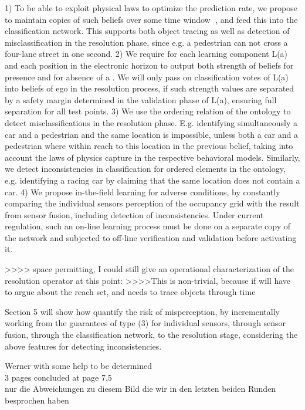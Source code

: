 1) To be able to exploit physical laws to optimize the prediction rate, we propose to maintain copies of such beliefs over some time window , and feed this into the classification network. This supports both object tracing as well as detection of misclassification in the resolution phase, since e.g. a pedestrian can not cross a four-lane street in one second.
2) We require for each learning component L(a) and each position in the electronic horizon to output both strength of beliefs for presence and for absence of a . We will only pass on classification votes of L(a) into beliefs of ego in the resolution process, if such strength values are separated by a safety margin determined in the validation phase of L(a), ensuring full separation for all test points.
3) We use the ordering relation of the ontology to detect misclassifications in the resolution phase. E.g. identifying simultaneously a car and a pedestrian and the same location is impossible, unless both a car and a pedestrian where within reach to this location in the previous belief, taking into account the laws of physics capture in the respective behavioral models. Similarly, we detect inconsistencies in classification for ordered elements in the ontology, e.g. identifying a racing car by claiming that the same location does not contain a car.
4) We propose in-the-field learning for adverse conditions, by constantly comparing the individual sensors perception of the occupancy grid with the result from sensor fusion, including detection of inconsistencies. Under current regulation, such an on-line learning process must be done on a separate copy of the network and subjected to off-line verification and validation before activating it.

>>>> space permitting, I could still give an operational characterization of the resolution operator at this point: >>>>This is non-trivial, because if will have to argue about the reach set, and needs to trace objects through time

Section 5 will show how quantify the risk of misperception, by incrementally working from the guarantees of type (3) for individual sensors, through sensor fusion, through the classification network, to the resolution stage, considering the above features for detecting inconsistencies.


Werner with some help to be determined\\
3 pages	concluded at page 7,5\\
nur die Abweichungen zu diesem Bild die wir in den letzten beiden Runden besprochen haben
